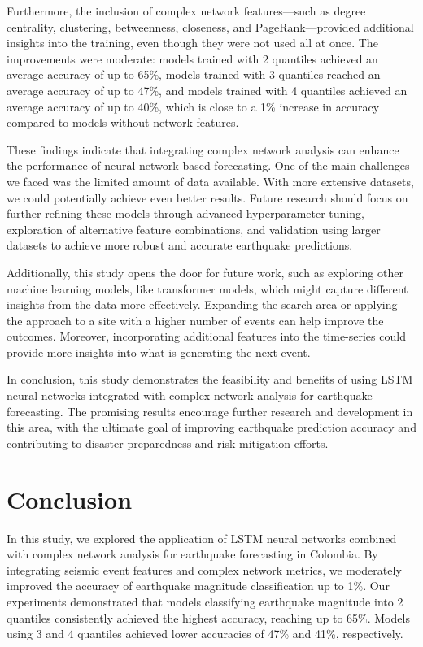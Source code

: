 \documentclass[sn-mathphys-num]{sn-jnl}
\begin{document}
Furthermore, the inclusion of complex network features—such as degree centrality, clustering, betweenness, closeness, and PageRank—provided additional insights into the training, even though they were not used all at once. The improvements were moderate: models trained with 2 quantiles achieved an average accuracy of up to 65\%, models trained with 3 quantiles reached an average accuracy of up to 47\%, and models trained with 4 quantiles achieved an average accuracy of up to 40\%, which is close to a 1\% increase in accuracy compared to models without network features.

These findings indicate that integrating complex network analysis can enhance the performance of neural network-based forecasting. One of the main challenges we faced was the limited amount of data available. With more extensive datasets, we could potentially achieve even better results. Future research should focus on further refining these models through advanced hyperparameter tuning, exploration of alternative feature combinations, and validation using larger datasets to achieve more robust and accurate earthquake predictions.

Additionally, this study opens the door for future work, such as exploring other machine learning models, like transformer models, which might capture different insights from the data more effectively. Expanding the search area or applying the approach to a site with a higher number of events can help improve the outcomes. Moreover, incorporating additional features into the time-series could provide more insights into what is generating the next event.

In conclusion, this study demonstrates the feasibility and benefits of using LSTM neural networks integrated with complex network analysis for earthquake forecasting. The promising results encourage further research and development in this area, with the ultimate goal of improving earthquake prediction accuracy and contributing to disaster preparedness and risk mitigation efforts.

\section{Conclusion}\label{conclusion}

In this study, we explored the application of LSTM neural networks combined with complex network analysis for earthquake forecasting in Colombia. By integrating seismic event features and complex network metrics, we moderately improved the accuracy of earthquake magnitude classification up to 1\%. Our experiments demonstrated that models classifying earthquake magnitude into 2 quantiles consistently achieved the highest accuracy, reaching up to 65\%. Models using 3 and 4 quantiles achieved lower accuracies of 47\% and 41\%, respectively.
\end{document}
